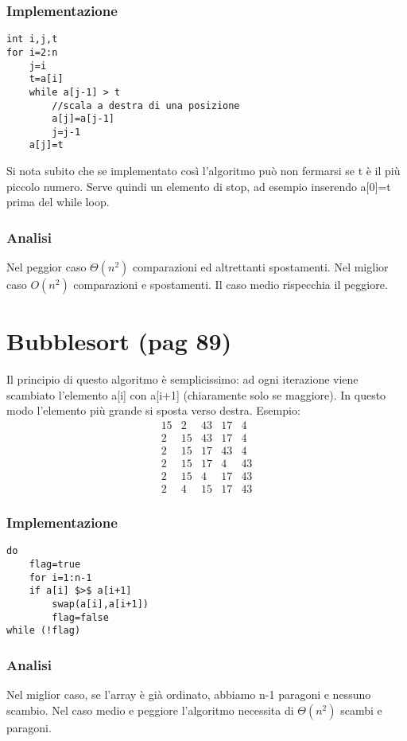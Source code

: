 \documentclass[a4paper]{book}
\begin{document}
\subsubsection*{Implementazione}
\begin{lstlisting}
int i,j,t
for i=2:n
	j=i
	t=a[i]
	while a[j-1] > t
		//scala a destra di una posizione
		a[j]=a[j-1]
		j=j-1
	a[j]=t
\end{lstlisting}
Si nota subito che se implementato così l'algoritmo può non fermarsi se t è il più piccolo numero. Serve quindi un elemento di stop, ad esempio inserendo a[0]=t prima del while loop.

\subsubsection*{Analisi}

Nel peggior caso $\Theta (n^2)$ comparazioni ed altrettanti spostamenti. Nel miglior caso $O(n^2)$ comparazioni e spostamenti. Il caso medio rispecchia il peggiore.

\section{Bubblesort (pag 89)}
Il principio di questo algoritmo è semplicissimo: ad ogni iterazione viene scambiato l'elemento a[i] con a[i+1] (chiaramente solo se maggiore). In questo modo l'elemento più grande si sposta verso destra. Esempio:
\[\begin{array}{*{20}{c}}
{15}&2&{43}&{17}&4\\
2&{15}&{43}&{17}&4\\
2&{15}&{17}&{43}&4\\
2&{15}&{17}&4&{43}\\
2&{15}&4&{17}&{43}\\
2&4&{15}&{17}&{43}
\end{array}\]
\subsubsection*{Implementazione}
\begin{lstlisting}
do
	flag=true
	for i=1:n-1
	if a[i] $>$ a[i+1] 
		swap(a[i],a[i+1])
		flag=false
while (!flag)
\end{lstlisting}
\subsubsection*{Analisi}

Nel miglior caso, se l'array è già ordinato, abbiamo n-1 paragoni e nessuno scambio. Nel caso medio e peggiore l'algoritmo necessita di $\Theta (n^2)$ scambi e paragoni.
\end{document}
